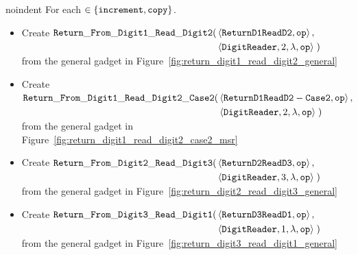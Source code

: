 noindent For each {\inc} $\in \{ {\tt increment, copy } \}$.


\begin{itemize}
    \item Create
    $\begin{aligned}[t]
        {\tt Return\_From\_Digit1\_Read\_Digit2}(& \left \langle {\tt ReturnD1ReadD2},          {\tt op} \right\rangle, \\
                                & \left \langle {\tt DigitReader}, 2, \lambda, {\tt op} \right\rangle \;)
    \end{aligned}$ \\ from the general gadget in Figure~\ref{fig:return_digit1_read_digit2_general}

    \item Create
    $\begin{aligned}[t]
        {\tt Return\_From\_Digit1\_Read\_Digit2\_Case2}(& \left \langle {\tt ReturnD1ReadD2-Case2},    {\tt op} \right\rangle, \\
                                        & \left \langle {\tt DigitReader}, 2, \lambda, {\tt op} \right\rangle \;)
    \end{aligned}$ \\ from the general gadget in Figure~\ref{fig:return_digit1_read_digit2_case2_msr}

    \item Create
    $\begin{aligned}[t]
        {\tt Return\_From\_Digit2\_Read\_Digit3}(& \left \langle {\tt ReturnD2ReadD3},             {\tt op} \right\rangle, \\
                                    & \left \langle {\tt DigitReader},  3, \lambda, {\tt op} \right\rangle \;)
    \end{aligned}$ \\ from the general gadget in Figure~\ref{fig:return_digit2_read_digit3_general}

    \item Create
    $\begin{aligned}[t]
            {\tt Return\_From\_Digit3\_Read\_Digit1}(& \left \langle {\tt ReturnD3ReadD1},           {\tt op} \right\rangle, \\
                                    & \left \langle {\tt DigitReader},  1, \lambda,   {\tt op} \right\rangle \;)
    \end{aligned}$ \\ from the general gadget in Figure~\ref{fig:return_digit3_read_digit1_general}

\end{itemize}

